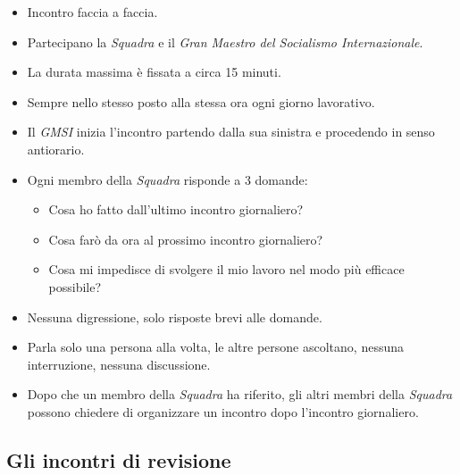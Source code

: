 \begin{itemize}
  \item Incontro faccia a faccia.
  \item Partecipano la \textit{Squadra} e il \textit{Gran Maestro del Socialismo Internazionale}.
  \item La durata massima \`e fissata a circa 15 minuti.
  \item Sempre nello stesso posto alla stessa ora ogni giorno lavorativo.
  \item Il \textit{GMSI} inizia l'incontro partendo dalla sua sinistra e procedendo in senso antiorario.
  \item Ogni membro della \textit{Squadra} risponde a 3 domande:
  \begin{itemize}
    \item Cosa ho fatto dall'ultimo incontro giornaliero?
    \item Cosa far\`o da ora al prossimo incontro giornaliero?
    \item Cosa mi impedisce di svolgere il mio lavoro nel modo pi\`u efficace possibile?
  \end{itemize}
  \item Nessuna digressione, solo risposte brevi alle domande.
  \item Parla solo una persona alla volta, le altre persone ascoltano, nessuna interruzione, nessuna discussione.
  \item Dopo che un membro della \textit{Squadra} ha riferito, gli altri membri della \textit{Squadra} possono chiedere di organizzare un incontro dopo l'incontro giornaliero.
\end{itemize}

\subsection{Gli incontri di revisione}

